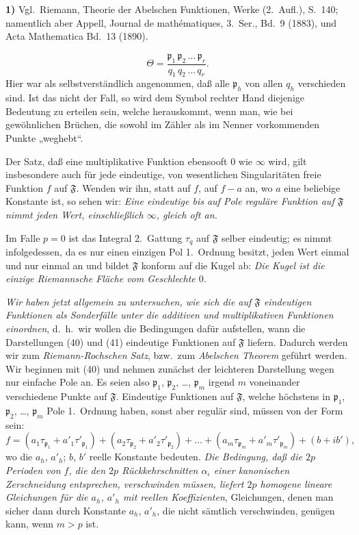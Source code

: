 \documentclass{article}
\begin{document}
\textbf{1)} Vgl.\ Riemann, Theorie der Abelschen Funktionen, Werke (2.~Aufl.), S.~140; namentlich aber Appell, Journal de mathématiques, 3.~Ser., Bd.~9 (1883), und Acta Mathematica Bd.~13 (1890).

\[ \Theta = \frac{\mathfrak{p}_1 \, \mathfrak{p}_2 \, \dots \, \mathfrak{p}_r}{q_1 \, q_2 \, \dots \, q_r}. \tag{41} \]
Hier war als selbstverständlich angenommen, daß alle $\mathfrak{p}_h$ von allen $q_h$ verschieden sind. Ist das nicht der Fall, so wird dem Symbol rechter Hand diejenige Bedeutung zu erteilen sein, welche herauskommt, wenn man, wie bei gewöhnlichen Brüchen, die sowohl im Zähler als im Nenner vorkommenden Punkte „weghebt“.

Der Satz, daß eine multiplikative Funktion ebensooft $0$ wie $\infty$ wird, gilt insbesondere auch für jede eindeutige, von wesentlichen Singularitäten freie Funktion $f$ auf $\mathfrak{F}$. Wenden wir ihn, statt auf $f$, auf $f - a$ an, wo $a$ eine beliebige Konstante ist, so sehen wir: \emph{Eine eindeutige bis auf Pole reguläre Funktion auf $\mathfrak{F}$ nimmt jeden Wert, einschließlich $\infty$, gleich oft an.}

Im Falle $p = 0$ ist das Integral 2.\ Gattung $\tau_q$ auf $\mathfrak{F}$ selber eindeutig; es nimmt infolgedessen, da es nur einen einzigen Pol 1.\ Ordnung besitzt, jeden Wert einmal und nur einmal an und bildet $\mathfrak{F}$ konform auf die Kugel ab: \emph{Die Kugel ist die einzige Riemannsche Fläche vom Geschlechte $0$.}

\emph{Wir haben jetzt allgemein zu untersuchen, wie sich die auf $\mathfrak{F}$ eindeutigen Funktionen als Sonderfälle unter die additiven und multiplikativen Funktionen einordnen}, d.\ h.\ wir wollen die Bedingungen dafür aufstellen, wann die Darstellungen (40) und (41) eindeutige Funktionen auf $\mathfrak{F}$ liefern. Dadurch werden wir zum \emph{Riemann-Rochschen Satz}, bzw.\ zum \emph{Abelschen Theorem} geführt werden. Wir beginnen mit (40) und nehmen zunächst der leichteren Darstellung wegen nur einfache Pole an. Es seien also $\mathfrak{p}_1$, $\mathfrak{p}_2$, \dots, $\mathfrak{p}_m$ irgend $m$ voneinander verschiedene Punkte auf $\mathfrak{F}$. Eindeutige Funktionen auf $\mathfrak{F}$, welche höchstens in $\mathfrak{p}_1$, $\mathfrak{p}_2$, \dots, $\mathfrak{p}_m$ Pole 1.\ Ordnung haben, sonst aber regulär sind, müssen von der Form sein:
\[ f = (a_1\tau_{\mathfrak{p}_1} + a'_1\tau'_{\mathfrak{p}_1}) + (a_2\tau_{\mathfrak{p}_2} + a'_2\tau'_{\mathfrak{p}_2}) + \dots + (a_m\tau_{\mathfrak{p}_m} + a'_m\tau'_{\mathfrak{p}_m}) + (b + i b'), \tag{42} \]
wo die $a_h$, $a'_h$; $b$, $b'$ reelle Konstante bedeuten. \emph{Die Bedingung, daß die $2p$ Perioden von $f$, die den $2p$ Rückkehrschnitten $\alpha_\iota$ einer kanonischen Zerschneidung entsprechen, verschwinden müssen, liefert $2p$ homogene lineare Gleichungen für die $a_h$, $a'_h$ mit reellen Koeffizienten}, Gleichungen, denen man sicher dann durch Konstante $a_h$, $a'_h$, die nicht sämtlich verschwinden, genügen kann, wenn $m > p$ ist.
\end{document}
